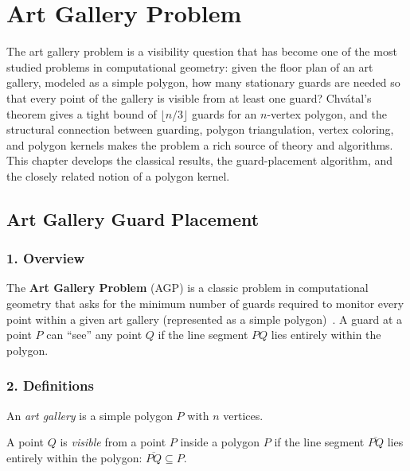 \chapter{Art Gallery Problem}
\label{ch:art_gallery}

The art gallery problem is a visibility question
that has become one of the most studied problems in computational geometry:
given the floor plan of an art gallery, modeled as a simple polygon, how many
stationary guards are needed so that every point of the gallery is visible
from at least one guard? Chv\'{a}tal's theorem gives a tight bound of
$\lfloor n/3 \rfloor$ guards for an $n$-vertex polygon, and the structural
connection between guarding, polygon triangulation, vertex coloring, and
polygon kernels makes the problem a rich source of theory and algorithms.
This chapter develops the classical results, the guard-placement algorithm,
and the closely related notion of a polygon kernel.

\section{Art Gallery Guard Placement}
\label{sec:art_gallery_guards}

\subsection{1. Overview}
The \textbf{Art Gallery Problem} (AGP) is a classic problem in computational geometry that asks for the minimum number of guards required to monitor every point within a given art gallery (represented as a simple polygon)~\cite{orourke1987}. A guard at a point $P$ can ``see'' any point $Q$ if the line segment $PQ$ lies entirely within the polygon.

\subsection{2. Definitions}
\begin{definition}
\label{def:ag_gallery}
An \emph{art gallery} is a simple polygon $P$ with $n$ vertices.
\end{definition}

\begin{definition}[Visibility]
\label{def:ag_visibility}
A point $Q$ is \emph{visible} from a point $P$ inside a polygon $P$ if the line segment $\overline{PQ}$ lies entirely within the polygon: $\overline{PQ} \subseteq P$.
\end{definition}

